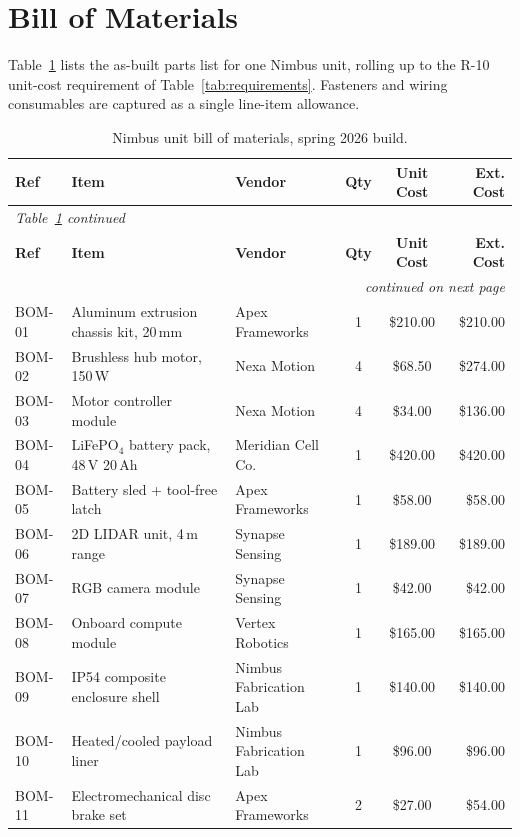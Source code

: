 \section{Bill of Materials}
\label{app:bom}

Table~\ref{tab:bom} lists the as-built parts list for one Nimbus unit,
rolling up to the R-10 unit-cost requirement of Table~\ref{tab:requirements}.
Fasteners and wiring consumables are captured as a single line-item allowance.

\begin{longtable}{@{}p{1.15cm}p{4.4cm}lccr@{}}
\caption{Nimbus unit bill of materials, spring 2026 build.}
\label{tab:bom} \\
\toprule
\textbf{Ref} & \textbf{Item} & \textbf{Vendor} & \textbf{Qty} & \textbf{Unit Cost} & \textbf{Ext. Cost} \\
\midrule
\endfirsthead
\multicolumn{6}{l}{\small\itshape Table~\ref{tab:bom} continued} \\
\toprule
\textbf{Ref} & \textbf{Item} & \textbf{Vendor} & \textbf{Qty} & \textbf{Unit Cost} & \textbf{Ext. Cost} \\
\midrule
\endhead
\midrule
\multicolumn{6}{r}{\small\itshape continued on next page} \\
\endfoot
\bottomrule
\endlastfoot
BOM-01 & Aluminum extrusion chassis kit, 20\,mm & Apex Frameworks & 1 & \$210.00 & \$210.00 \\
BOM-02 & Brushless hub motor, 150\,W & Nexa Motion & 4 & \$68.50 & \$274.00 \\
BOM-03 & Motor controller module & Nexa Motion & 4 & \$34.00 & \$136.00 \\
BOM-04 & LiFePO$_4$ battery pack, 48\,V 20\,Ah & Meridian Cell Co. & 1 & \$420.00 & \$420.00 \\
BOM-05 & Battery sled + tool-free latch & Apex Frameworks & 1 & \$58.00 & \$58.00 \\
BOM-06 & 2D LIDAR unit, 4\,m range & Synapse Sensing & 1 & \$189.00 & \$189.00 \\
BOM-07 & RGB camera module & Synapse Sensing & 1 & \$42.00 & \$42.00 \\
BOM-08 & Onboard compute module & Vertex Robotics & 1 & \$165.00 & \$165.00 \\
BOM-09 & IP54 composite enclosure shell & Nimbus Fabrication Lab & 1 & \$140.00 & \$140.00 \\
BOM-10 & Heated/cooled payload liner & Nimbus Fabrication Lab & 1 & \$96.00 & \$96.00 \\
BOM-11 & Electromechanical disc brake set & Apex Frameworks & 2 & \$27.00 & \$54.00 \\

\end{longtable}
